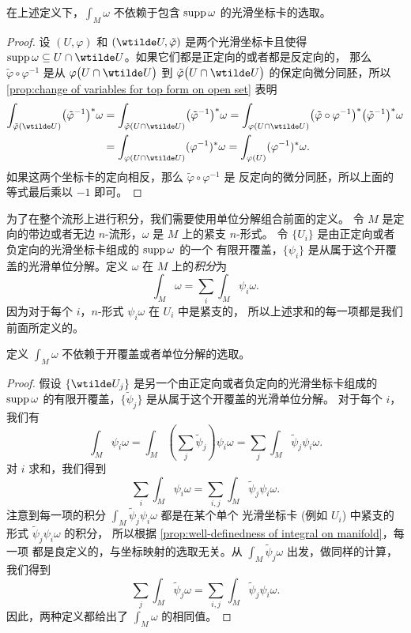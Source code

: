 \begin{proposition}\label{prop:well-definedness of integral on manifold}
  在上述定义下，$\int_M\omega$ 不依赖于包含 $\operatorname{supp}\omega$ 的光滑坐标卡的选取。
\end{proposition}
\begin{proof}
  设 $(U,\varphi)$ 和 $(\wtilde U,\tilde\varphi)$ 是两个光滑坐标卡且使得
  $\supp\omega\subseteq U\cap\wtilde U$。如果它们都是正定向的或者都是反定向的，
  那么 $\tilde\varphi\circ\varphi^{-1}$ 是从 $\varphi\bigl( U\cap\wtilde U\bigr)$
  到 $\tilde\varphi\bigl( U\cap\wtilde U\bigr)$ 的保定向微分同胚，所以
  \autoref{prop:change of variables for top form on open set} 表明
  \begin{align*}
    \int_{\tilde\varphi(\wtilde U)}\bigl(\tilde{\varphi}^{-1}\bigr)^*\omega
    &=\int_{\tilde{\varphi}(U\cap\wtilde U)} \bigl(\tilde{\varphi}^{-1}\bigr)^*\omega
    =\int_{\varphi(U\cap\wtilde U)} 
    \bigl(\tilde\varphi\circ\varphi^{-1}\bigr)^*\bigl(\tilde\varphi^{-1}\bigr)^*\omega\\
    &=\int_{\varphi(U\cap\wtilde U)} (\varphi^{-1})^*\omega 
    =\int_{\varphi(U)} (\varphi^{-1})^*\omega.
  \end{align*}
  如果这两个坐标卡的定向相反，那么 $\tilde\varphi\circ\varphi^{-1}$ 是
  反定向的微分同胚，所以上面的等式最后乘以 $-1$ 即可。
\end{proof}

为了在整个流形上进行积分，我们需要使用单位分解组合前面的定义。
令 $M$ 是定向的带边或者无边 $n$-流形，$\omega$ 是 $M$ 上的紧支 $n$-形式。
令 $\{U_i\}$ 是由正定向或者负定向的光滑坐标卡组成的 $\operatorname{supp}\omega$ 的一个
有限开覆盖，$\{\psi_i\}$ 是从属于这个开覆盖的光滑单位分解。定义
$\omega$ 在 $M$ 上的\emph{积分}为
\begin{equation}
  \int_M\omega=\sum_i\int_M\psi_i\omega.
\end{equation}
因为对于每个 $i$，$n$-形式 $\psi_i\omega$ 在 $U_i$ 中是紧支的，
所以上述求和的每一项都是我们前面所定义的。

\begin{proposition}
  定义 $\int_M\omega$ 不依赖于开覆盖或者单位分解的选取。
\end{proposition}
\begin{proof}
  假设 $\{\wtilde U_j\}$ 是另一个由正定向或者负定向的光滑坐标卡组成的
  $\operatorname{supp}\omega$ 的有限开覆盖，$\{\tilde\psi_j\}$ 是从属于这个开覆盖的光滑单位分解。
  对于每个 $i$，我们有
  \[
    \int_M\psi_i\omega=\int_M\left(\sum_j\tilde\psi_j\right)\psi_i\omega
    =\sum_j \int_M \tilde\psi_j\psi_i\omega.
  \]
  对 $i$ 求和，我们得到
  \[
    \sum_i\int_M\psi_i\omega=\sum_{i,j}\int_M\tilde{\psi}_j\psi_i\omega.
  \]
  注意到每一项的积分 $\int_M \tilde\psi_j\psi_i\omega$ 都是在某个单个 
  光滑坐标卡 (例如 $U_i$) 中紧支的形式 $\tilde\psi_j\psi_i\omega$ 的积分，
  所以根据 \autoref{prop:well-definedness of integral on manifold}，每一项
  都是良定义的，与坐标映射的选取无关。从 $\int_M\tilde\psi_j\omega$
  出发，做同样的计算，我们得到
  \[
    \sum_j\int_M\tilde\psi_j\omega=\sum_{i,j}\int_M\tilde{\psi}_j\psi_i\omega.
  \]
  因此，两种定义都给出了 $\int_M\omega$ 的相同值。
\end{proof}

